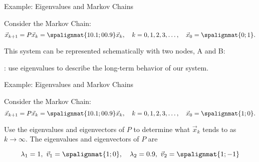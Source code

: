 \begin{frame}{Example: Eigenvalues and Markov Chains}


    Consider the Markov Chain: $$\vec x_{k+1} = P\vec x_{k} = \spalignmat{1 0.1 ;0 0.9 }\vec x_{k}, \quad k= 0, 1, 2, 3, \ldots, \quad \vec x_0 = \spalignmat{0;1}.$$

    \pause 
    
    This system can be represented schematically with two nodes, A and B: 
    
    \vspace{-6pt} 
    
    \begin{center}
    \end{center}
    
    \vspace{-6pt} 
    
    \pause

    : use eigenvalues to describe the long-term behavior of our system. 
    
\end{frame}





\begin{frame}{Example: Eigenvalues and Markov Chains}

    Consider the Markov Chain: $$\vec x_{k+1} = P\vec x_{k} = \spalignmat{1 0.1 ;0 0.9 }\vec x_{k}, \quad k= 0, 1, 2, 3, \ldots, \quad \vec x_0 = \spalignmat{1;0}.$$

    Use the eigenvalues and eigenvectors of $P$ to determine what $\vec x_k$ tends to as $k\to\infty$. The eigenvalues and eigenvectors of $P$ are
    
    $$\lambda_1 = 1, \ \vec v_1 = \spalignmat{1;0}, \quad \lambda_2 = 0.9, \ \vec v_2 = \spalignmat{1;-1}$$
    
    
 
    
    
\end{frame}



